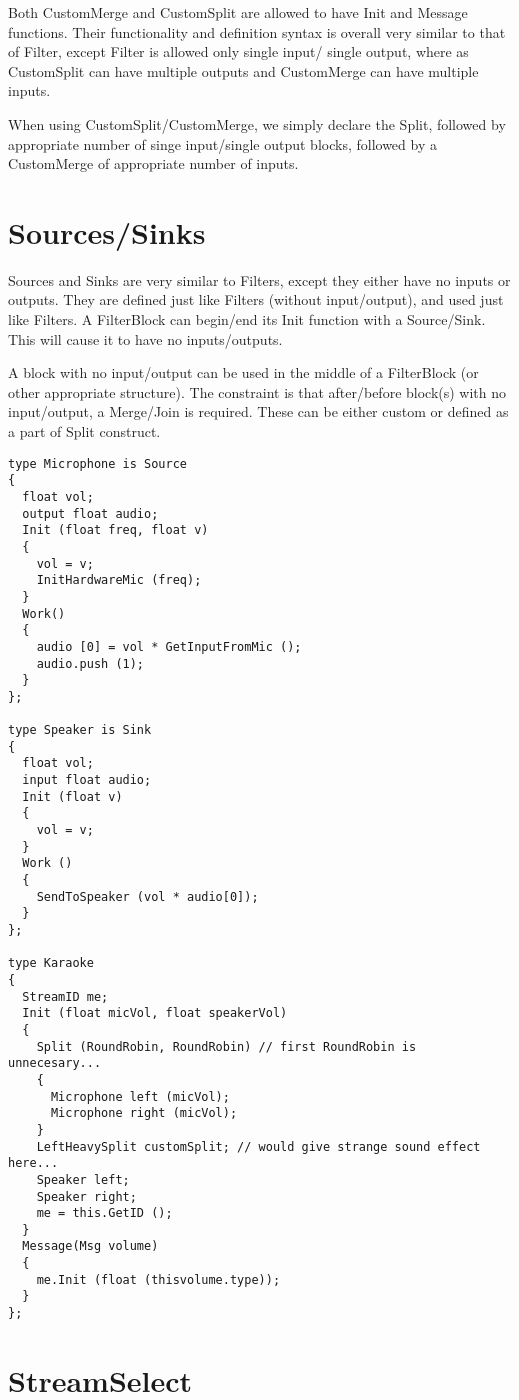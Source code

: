 Both CustomMerge and CustomSplit are allowed to have Init and Message
functions.  Their functionality and definition syntax is overall very
similar to that of Filter, except Filter is allowed only single input/
single output, where as CustomSplit can have multiple outputs and 
CustomMerge can have multiple inputs.

When using CustomSplit/CustomMerge, we simply declare the Split, followed
by appropriate number of singe input/single output blocks, followed by
a CustomMerge of appropriate number of inputs.

\section{Sources/Sinks}

Sources and Sinks are very similar to Filters, except they either have
no inputs or outputs.  They are defined just like Filters (without
input/output), and used just like Filters.  A FilterBlock can begin/end
its Init function with a Source/Sink.  This will cause it to have
no inputs/outputs.

A block with no input/output can be used in the middle of a FilterBlock (or
other appropriate structure).  The constraint is that after/before block(s) 
with no input/output, a Merge/Join is required.  These can be either
custom or defined as a part of Split construct.

\begin{verbatim}
type Microphone is Source
{
  float vol;
  output float audio;
  Init (float freq, float v)
  {
    vol = v;
    InitHardwareMic (freq);
  }
  Work()
  {
    audio [0] = vol * GetInputFromMic ();
    audio.push (1);
  }
};

type Speaker is Sink
{
  float vol;
  input float audio;
  Init (float v)
  {
    vol = v;
  }
  Work ()
  {
    SendToSpeaker (vol * audio[0]);
  }
};

type Karaoke
{
  StreamID me;
  Init (float micVol, float speakerVol)
  {
    Split (RoundRobin, RoundRobin) // first RoundRobin is unnecesary...
    {
      Microphone left (micVol);
      Microphone right (micVol);
    }
    LeftHeavySplit customSplit; // would give strange sound effect here...
    Speaker left;
    Speaker right;
    me = this.GetID ();
  }
  Message(Msg volume)
  {
    me.Init (float (thisvolume.type));
  }
};

\end{verbatim}

\section{StreamSelect}

